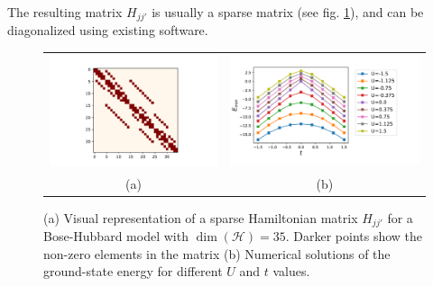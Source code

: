 \documentclass[12pt, a4paper,  nobibnotes]{article}
\begin{document}
The resulting matrix $H_{jj'}$ is usually a sparse matrix (see fig. \ref{fig:exactdiagonalization}),
and can be diagonalized using existing software.
\begin{figure}[H]
    \centering
    \begin{tabular}{cc}
      \includegraphics[height=0.2\textheight]{figures/real_fock_matrix_M=4_cutoff=4_t=-0_5_U=-0_5.pdf} & \includegraphics[height=0.2\textheight]{figures/diagonalized_solutions_M=4_cutoff=4.pdf} \\
      (a) & (b) \\[6pt]
    \end{tabular}
    \caption{(a) Visual representation of a sparse Hamiltonian matrix $H_{jj'}$ for a Bose-Hubbard model
    with $\dim(\mathcal H)=35$.
    Darker points show the non-zero elements in the matrix (b) Numerical solutions of the ground-state
    energy for different $U$ and $t$ values.}
    \label{fig:exactdiagonalization}
\end{figure}
\end{document}
